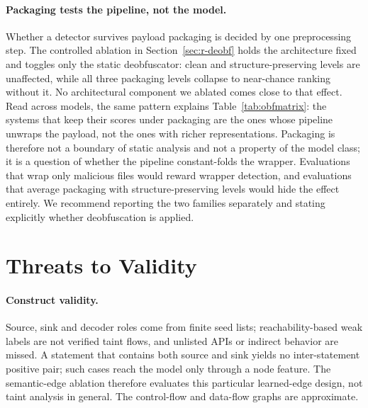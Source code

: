 \documentclass[pdflatex,sn-mathphys-num]{sn-jnl}
\begin{document}
\paragraph{Packaging tests the pipeline, not the model.} Whether a detector
survives payload packaging is decided by one preprocessing step. The controlled
ablation in Section~\ref{sec:r-deobf} holds the architecture fixed and toggles
only the static deobfuscator: clean and structure-preserving levels are
unaffected, while all three packaging levels collapse to near-chance ranking
without it. No architectural component we ablated comes close to that effect.
Read across models, the same pattern explains Table~\ref{tab:obfmatrix}: the
systems that keep their scores under packaging are the ones whose pipeline
unwraps the payload, not the ones with richer representations. Packaging is
therefore not a boundary of static analysis and not a property of the model
class; it is a question of whether the pipeline constant-folds the wrapper.
Evaluations that wrap only malicious files would reward wrapper detection, and
evaluations that average packaging with structure-preserving levels would hide
the effect entirely. We recommend reporting the two families separately and
stating explicitly whether deobfuscation is applied.

\section{Threats to Validity}\label{sec:threats}
\paragraph{Construct validity.} Source, sink and decoder roles come from finite
seed lists; reachability-based weak labels are not verified taint flows, and
unlisted APIs or indirect behavior are missed. A statement that contains both
source and sink yields no inter-statement positive pair; such cases reach the
model only through a node feature. The semantic-edge ablation therefore
evaluates this particular learned-edge design, not taint analysis in general.
The control-flow and data-flow graphs are approximate.
\end{document}
